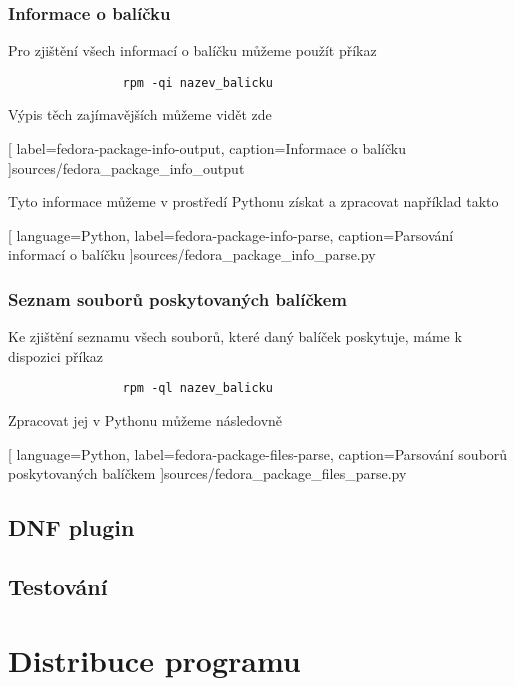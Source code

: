 \documentclass[10pt,a4paper]{article}
\begin{document}

			\subsubsection{Informace o balíčku}
			Pro zjištění všech informací o balíčku můžeme použít příkaz

			\begin{lstlisting}
				rpm -qi nazev_balicku
			\end{lstlisting}

			Výpis těch zajímavějších můžeme vidět zde
			
			[
				label=fedora-package-info-output,
				caption={Informace o balíčku}
			]{sources/fedora_package_info_output}

			Tyto informace můžeme v prostředí Pythonu získat a zpracovat například takto
			
			[
				language=Python,
				label=fedora-package-info-parse,
				caption={Parsování informací o balíčku}
			]{sources/fedora_package_info_parse.py}

			\subsubsection{Seznam souborů poskytovaných balíčkem}
			Ke zjištění seznamu všech souborů, které daný balíček poskytuje, máme k dispozici příkaz

			\begin{lstlisting}
				rpm -ql nazev_balicku
			\end{lstlisting}

			Zpracovat jej v Pythonu můžeme následovně

			
			[
				language=Python,
				label=fedora-package-files-parse,
				caption={Parsování souborů poskytovaných balíčkem}
			]{sources/fedora_package_files_parse.py}

		\subsection{DNF plugin}
		\subsection{Testování}

	\section{Distribuce programu}
\end{document}
